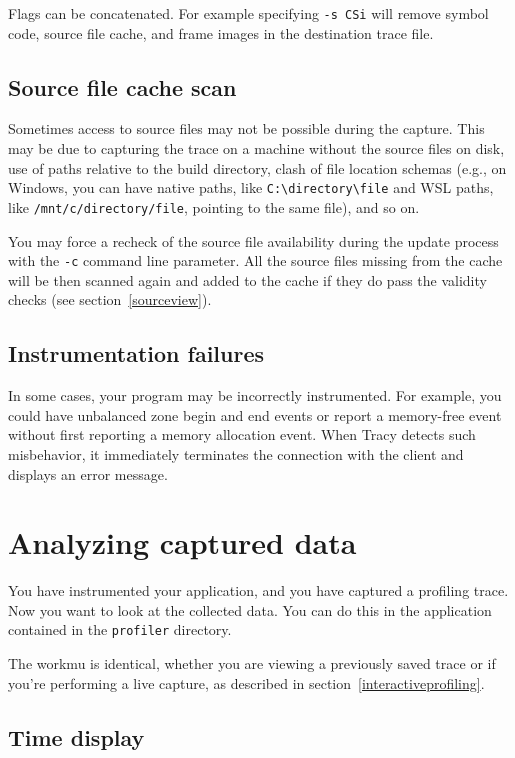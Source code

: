 \documentclass[hidelinks,titlepage,a4paper,twoside]{article}
\begin{document}
Flags can be concatenated. For example specifying \texttt{-s CSi} will remove symbol code, source file cache, and frame images in the destination trace file.

\subsection{Source file cache scan}

Sometimes access to source files may not be possible during the capture. This may be due to capturing the trace on a machine without the source files on disk, use of paths relative to the build directory, clash of file location schemas (e.g., on Windows, you can have native paths, like \texttt{C:\textbackslash{}directory\textbackslash{}file} and WSL paths, like \texttt{/mnt/c/directory/file}, pointing to the same file), and so on.

You may force a recheck of the source file availability during the update process with the \texttt{-c} command line parameter. All the source files missing from the cache will be then scanned again and added to the cache if they do pass the validity checks (see section~\ref{sourceview}).

\subsection{Instrumentation failures}
\label{instrumentationfailures}

In some cases, your program may be incorrectly instrumented. For example, you could have unbalanced zone begin and end events or report a memory-free event without first reporting a memory allocation event. When Tracy detects such misbehavior, it immediately terminates the connection with the client and displays an error message.

\section{Analyzing captured data}
\label{analyzingdata}

You have instrumented your application, and you have captured a profiling trace. Now you want to look at the collected data. You can do this in the application contained in the \texttt{profiler} directory.

The workmu is identical, whether you are viewing a previously saved trace or if you're performing a live capture, as described in section~\ref{interactiveprofiling}.

\subsection{Time display}
\end{document}
